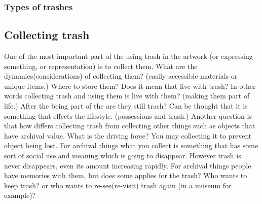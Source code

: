 \documentclass{article}
\begin{document}
\subsubsection{Types of trashes}

\subsection{Collecting trash}
One of the most important part of the using trash in the artwork (or expressing something, or representation) is to collect them. What are the dynamics(considerations) of collecting them? (easily accessible materials or unique items.) Where to store them? Does it mean that live with trash? In other words collecting trash and using them is live with them? (making them part of life.) After the being part of the are they still trash? Can be thought that it is something that effects the lifestyle. (possessions and trash.) Another question is that how differs collecting trash from collecting other things such as objects that have archival value. What is the driving force? You may collecting it to prevent object being lost. For archival things what you collect is something that has some sort of social use and meaning which is going to disappear. However trash is never disappears, even its amount increasing rapidly. For archival things people have memories with them, but does some applies for the trash? Who wants to keep trash? or who wants to re-see(re-visit) trash again (in a museum for example)?
\end{document}
